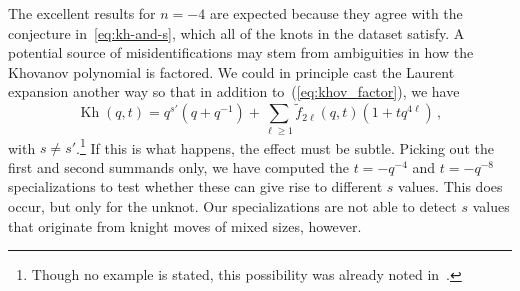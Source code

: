 \documentclass[11pt]{article}
\DeclareMathOperator{\Kh}{Kh}
\newcommand\eref[1]{(\ref{#1})}
\numberwithin{equation}{section}
\begin{document}
The excellent results for $n=-4$ are expected because they agree with the conjecture in~\eqref{eq:kh-and-s}, which all of the knots in the dataset satisfy.
A potential source of misidentifications may stem from ambiguities in how the Khovanov polynomial is factored.
We could in principle cast the Laurent expansion another way so that in addition to~\eref{eq:khov_factor}, we have
\begin{equation}
\Kh(q,t) = q^{s'}(q+q^{-1}) + \sum_{\ell\ge 1} \widetilde{f}_{2\ell}(q,t) (1+tq^{4\ell}) \,,
\end{equation}with $s\ne s'$.\footnote{
Though no example is stated, this possibility was already noted in~\cite{freedman2010man}.}
If this is what happens, the effect must be subtle.
Picking out the first and second summands only, we have computed the $t=-q^{-4}$ and $t=-q^{-8}$ specializations to test whether these can give rise to different $s$ values.
This does occur, but only for the unknot.
Our specializations are not able to detect $s$ values that originate from knight moves of mixed sizes, however.
\end{document}
